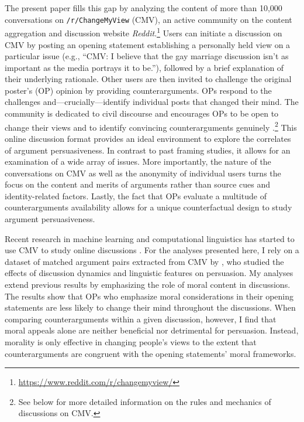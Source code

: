 The present paper fills this gap by analyzing the content of more than 10,000 conversations on \texttt{/r/ChangeMyView} (CMV), an active community on the content aggregation and discussion website \textit{Reddit}.\footnote{\url{https://www.reddit.com/r/changemyview/}} Users can initiate a discussion on CMV by posting an opening statement establishing a personally held view on a particular issue (e.g., ``CMV: I believe that the gay marriage discussion isn't as important as the media portrays it to be.''), followed by a brief explanation of their underlying rationale. Other users are then invited to challenge the original poster's (OP) opinion by providing counterarguments. OPs respond to the challenges and---crucially---identify individual posts that changed their mind. The community is dedicated to civil discourse and encourages OPs to be open to change their views and to identify convincing counterarguments genuinely \citep[e.g.,][]{jhaver2017designing}.\footnote{See below for more detailed information on the rules and mechanics of discussions on CMV.} This online discussion format provides an ideal environment to explore the correlates of argument persuasiveness. In contrast to past framing studies, it allows for an examination of a wide array of issues. More importantly, the nature of the conversations on CMV as well as the anonymity of individual users turns the focus on the content and merits of arguments rather than source cues and identity-related factors. Lastly, the fact that OPs evaluate a multitude of counterarguments availability allows for a unique counterfactual design to study argument persuasiveness.

Recent research in machine learning and computational linguistics has started to use CMV to study online discussions \citep{wei2016post,hidey2017analyzing}. For the analyses presented here, I rely on a dataset of matched argument pairs extracted from CMV by \citet{tan2016winning}, who studied the effects of discussion dynamics and linguistic features on persuasion. My analyses extend previous results by emphasizing the role of moral content in discussions. The results show that OPs who emphasize moral considerations in their opening statements are less likely to change their mind throughout the discussions. When comparing counterarguments within a given discussion, however, I find that moral appeals alone are neither beneficial nor detrimental for persuasion. Instead, morality is only effective in changing people's views to the extent that counterarguments are congruent with the opening statements' moral frameworks.


